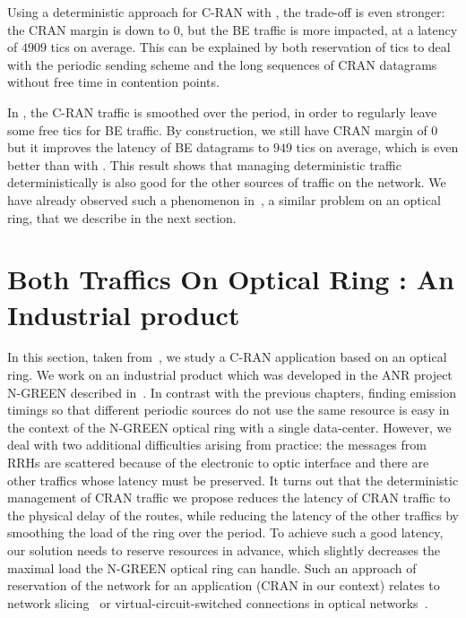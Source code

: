      Using a deterministic approach for C-RAN with \PMLS, the trade-off is even stronger:
      the CRAN margin is down to $0$, but the BE traffic is more impacted, at a latency of $4909$ tics on average. This can be explained by both reservation of tics to deal with the periodic sending scheme and the long sequences of CRAN datagrams without free time in contention points.
     
     In \SPMLS, the C-RAN traffic is smoothed over the period, in order to regularly leave some free tics for BE traffic. By construction, we still have CRAN margin of $0$ but it improves the latency of 
     BE datagrams to $949$ tics on average, which is even better than with \FIFO. 
     This result shows that managing deterministic traffic deterministically is also good for the other sources of traffic on the network. We have already observed such a phenomenon in~\cite{DBLP:conf/ondm/BarthGS19}, a similar 
     problem on an optical ring, that we describe in the next section.
     
   


\section{Both Traffics On Optical Ring : An Industrial product}
\label{sec:NGREEN}

In this section, taken from~\cite{DBLP:conf/ondm/BarthGS19}, we study a C-RAN application based on an optical ring. We work on an industrial product which was developed in the ANR project N-GREEN described in~\cite{ngreenarchitecture,uscumlic2018scalable}.
In contrast with the previous chapters, finding emission timings so that different periodic sources do not use the same resource is easy in the context of the N-GREEN optical ring with a single data-center. However, we deal with two additional difficulties arising from practice: the messages from RRHs are scattered because of the electronic to optic interface and there are other traffics whose latency must be preserved. It turns out that the deterministic management of CRAN traffic we propose reduces the latency of CRAN traffic to the physical delay of the routes, while reducing the latency of the other traffics by smoothing the load of the ring over the period. To achieve such a good latency, our solution needs to reserve resources in advance, which slightly decreases the maximal load the N-GREEN optical ring can handle. Such an approach of reservation of the network for an application (CRAN in our context) relates to network slicing~\cite{jiang2016network} or virtual-circuit-switched connections in optical networks~\cite{cadere2010virtual,szymanski2016ultra}.

